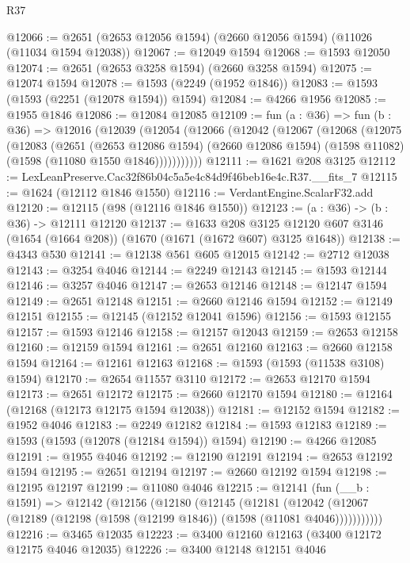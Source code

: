 \begin{lexlean}{R37}
\begin{coremodule}
@12066 := @2651 (@2653 @12056 @1594) (@2660 @12056 @1594) (@11026 (@11034 @1594 @12038))
@12067 := @12049 @1594
@12068 := @1593 @12050
@12074 := @2651 (@2653 @3258 @1594) (@2660 @3258 @1594)
@12075 := @12074 @1594
@12078 := @1593 (@2249 (@1952 @1846))
@12083 := @1593 (@1593 (@2251 (@12078 @1594)) @1594)
@12084 := @4266 @1956
@12085 := @1955 @1846
@12086 := @12084 @12085
@12109 := fun (a : @36) =>
  fun (b : @36) =>
  @12016
    (@12039
      (@12054
        (@12066
          (@12042
            (@12067
              (@12068
                (@12075
                  (@12083
                    (@2651
                      (@2653 @12086 @1594)
                      (@2660 @12086 @1594)
                      (@1598 @11082)
                      (@1598 (@11080 @1550 @1846)))))))))))
@12111 := @1621 @208 @3125
@12112 := LexLeanPreserve.Cac32f86b04c5a5e4c84d9f46beb16e4c.R37.__fits_7
@12115 := @1624 (@12112 @1846 @1550)
@12116 := VerdantEngine.ScalarF32.add
@12120 := @12115 (@98 (@12116 @1846 @1550))
@12123 := (a : @36) -> (b : @36) -> @12111 @12120
@12137 := @1633
    @208
    @3125
    @12120
    @607
    @3146
    (@1654 (@1664 @208))
    (@1670 (@1671 (@1672 @607) @3125 @1648))
@12138 := @4343 @530
@12141 := @12138 @561 @605 @12015
@12142 := @2712 @12038
@12143 := @3254 @4046
@12144 := @2249 @12143
@12145 := @1593 @12144
@12146 := @3257 @4046
@12147 := @2653 @12146
@12148 := @12147 @1594
@12149 := @2651 @12148
@12151 := @2660 @12146 @1594
@12152 := @12149 @12151
@12155 := @12145 (@12152 @12041 @1596)
@12156 := @1593 @12155
@12157 := @1593 @12146
@12158 := @12157 @12043
@12159 := @2653 @12158
@12160 := @12159 @1594
@12161 := @2651 @12160
@12163 := @2660 @12158 @1594
@12164 := @12161 @12163
@12168 := @1593 (@1593 (@11538 @3108) @1594)
@12170 := @2654 @11557 @3110
@12172 := @2653 @12170 @1594
@12173 := @2651 @12172
@12175 := @2660 @12170 @1594
@12180 := @12164 (@12168 (@12173 @12175 @1594 @12038))
@12181 := @12152 @1594
@12182 := @1952 @4046
@12183 := @2249 @12182
@12184 := @1593 @12183
@12189 := @1593 (@1593 (@12078 (@12184 @1594)) @1594)
@12190 := @4266 @12085
@12191 := @1955 @4046
@12192 := @12190 @12191
@12194 := @2653 @12192 @1594
@12195 := @2651 @12194
@12197 := @2660 @12192 @1594
@12198 := @12195 @12197
@12199 := @11080 @4046
@12215 := @12141
    (fun (__b : @1591) =>
    @12142
      (@12156
        (@12180
          (@12145
            (@12181
              (@12042 (@12067 (@12189 (@12198 (@1598 (@12199 @1846)) (@1598 (@11081 @4046)))))))))))
@12216 := @3465 @12035
@12223 := @3400 @12160 @12163 (@3400 @12172 @12175 @4046 @12035)
@12226 := @3400 @12148 @12151 @4046

\end{coremodule}
\end{lexlean}
